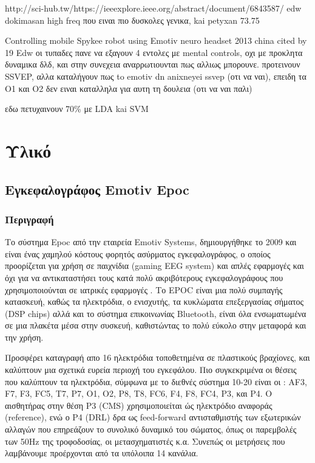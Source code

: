 \documentclass[11pt,a4paper,english,greek,twoside]{../Thesis}
\begin{document}
http://sci-hub.tw/https://ieeexplore.ieee.org/abstract/document/6843587/
edw dokimasan high freq που ειναι πιο δυσκολες γενικα, kai petyxan 73.75%

Controlling mobile Spykee robot using Emotiv neuro headset 2013 china
cited by 19
Edw οι τυπαδες πανε να εξαγουν 4 εντολες με mental controls, οχι με προκλητα δυναμικα δλδ, και στην συνεχεια αναρρωτιουνται πως αλλιως μπορουνε. προτεινουν SSVEP, αλλα καταλήγουν πως to emotiv dn anixneyei ssvep (οτι να ναι), επειδη τα Ο1 και Ο2 δεν ειναι καταλληλα για αυτη τη δουλεια (οτι να ναι παλι)

εδω πετυχαινουν 70\% με LDA kai SVM





\section{Υλικό}
\subsection{Εγκεφαλογράφος Emotiv Epoc}
\subsubsection{Περιγραφή}
\par Το σύστημα  Epoc από την εταιρεία Emotiv Systems, δημιουργήθηκε το 2009 και είναι ένας χαμηλού κόστους φορητός ασύρματος εγκεφαλογράφος, ο οποίος προορίζεται για χρήση σε παιχνίδια (gaming EEG system) και απλές εφαρμογές και όχι για να αντικαταστήσει τους κατά πολύ ακριβότερους εγκεφαλογράφους που χρησιμοποιούνται σε ιατρικές εφαρμογές . Το EPOC είναι μια πολύ συμπαγής κατασκευή, καθώς τα ηλεκτρόδια, ο ενισχυτής, τα κυκλώματα επεξεργασίας σήματος (DSP chips) αλλά και το σύστημα επικοινωνίας Bluetooth, είναι όλα ενσωματωμένα σε μια πλακέτα μέσα στην συσκευή, καθιστώντας το πολύ εύκολο στην μεταφορά και την χρήση. 
\par Προσφέρει καταγραφή απο 16 ηλεκτρόδια τοποθετημένα σε πλαστικούς βραχίονες, και  καλύπτουν μια σχετικά ευρεία περιοχή του εγκεφάλου. Πιο συγκεκριμένα οι θέσεις που καλύπτουν τα ηλεκτρόδια, σύμφωνα με το διεθνές σύστημα 10-20 είναι οι : AF3, F7, F3, FC5, T7, P7, O1, O2, P8, T8, FC6, F4, F8, FC4, P3, και P4. Ο αισθητήρας στην θέση P3 (CMS) χρησιμοποιείται ώς ηλεκτρόδιο αναφοράς (reference), ενώ ο P4 (DRL) δρα ως feed-forward αντισταθμιστής των εξωτερικών αλλαγών που επηρεάζουν το συνολικό δυναμικό του σώματος, όπως οι παρεμβολές των 50Hz της τροφοδοσίας, οι μετασχηματιστές κ.α. Συνεπώς οι μετρήσεις που λαμβάνουμε προέρχονται από τα υπόλοιπα 14 κανάλια.
\end{document}
